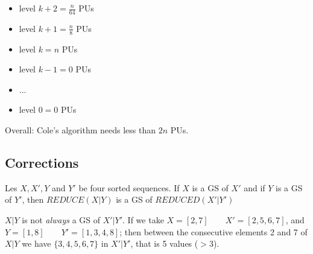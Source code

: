 \begin{itemize}
\item level $k+2=\frac{n}{64}$ PUs
\item level $k+1=\frac{n}{8}$ PUs
\item level $k=n$ PUs
\item level $k-1=0$ PUs
\item ...
\item level $0=0$ PUs
\end{itemize}

Overall: Cole's algorithm needs less than $2n$  PUs.


\subsection{Corrections}
\begin{lemma}
Les $X,X',Y$ and $Y'$ be four sorted sequences. If $X$ is a GS of $X'$ and if $Y$ is a GS of $Y'$, then $REDUCE(X|Y)$ is a GS of $REDUCED(X'|Y')$
\end{lemma}

 $X|Y$ is not \emph{always} a GS of $X'|Y'$. If we take $X=[2,7] \qquad X'=[2,5,6,7]$, and $Y=[1,8] \qquad Y'=[1,3,4,8]$; then between the consecutive elements 2 and 7 of $X|Y$ we have $\{3,4,5,6,7\}$ in $X'|Y'$, that is 5 values ($>3$).

